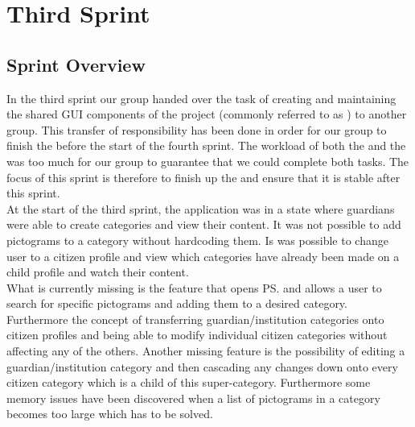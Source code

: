 \part{Third Sprint}
\label{par:third_sprint}

\chapter{Sprint Overview}
In the third sprint our group handed over the task of creating and maintaining the shared GUI components of the project (commonly referred to as \gc) to another group. This transfer of responsibility has been done in order for our group to finish the \ct before the start of the fourth sprint. The workload of both the \ct and the \gc was too much for our group to guarantee that we could complete both tasks. The focus of this sprint is therefore to finish up the \ct and ensure that it is stable after this sprint.\\

At the start of the third sprint, the application was in a state where guardians were able to create categories and view their content. It was not possible to add pictograms to a category without hardcoding them. Is was possible to change user to a citizen profile and view which categories have already been made on a child profile and watch their content. \\

What is currently missing is the feature that opens \ps and allows a user to search for specific pictograms and adding them to a desired category. Furthermore the concept of transferring guardian/institution categories onto citizen profiles and being able to modify individual citizen categories without affecting any of the others. Another missing feature is the possibility of editing a guardian/institution category and then cascading any changes down onto every citizen category which is a child of this super-category. Furthermore some memory issues have been discovered when a list of pictograms in a category becomes too large which has to be solved. 



